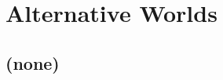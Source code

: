 
\cleardoublepage


\chapter{Alternative Worlds}\label{ch:alt-worlds}

\hfill \break

\newpage

\section{(none)}

